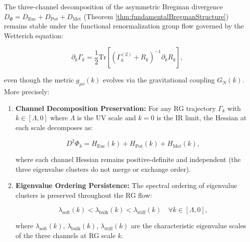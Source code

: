 
\begin{theorem}
\label{thm:divergenceRigidityRGFlow}

The three-channel decomposition of the asymmetric Bregman divergence $D_\Phi = D_{\mathrm{Euc}} + D_{\mathrm{Pot}} + D_{\mathrm{Met}}$ (Theorem \ref{thm:fundamentalBregmanStructure}) remains stable under the functional renormalization group flow governed by the Wetterich equation:

\begin{equation}
\partial_k \Gamma_k = \frac{1}{2} \mathrm{Tr}\left[(\Gamma_k^{(2)} + R_k)^{-1} \partial_k R_k\right],
\end{equation}

even though the metric $g_{\mu\nu}(k)$ evolves via the gravitational coupling $G_N(k)$. More precisely:

\begin{enumerate}

\item \textbf{Channel Decomposition Preservation:} For any RG trajectory $\Gamma_k$ with $k \in [\Lambda, 0]$ where $\Lambda$ is the UV scale and $k = 0$ is the IR limit, the Hessian at each scale decomposes as:

\begin{equation}
D^2\Phi_k = H_{\mathrm{Euc}}(k) + H_{\mathrm{Pot}}(k) + H_{\mathrm{Met}}(k),
\end{equation}

where each channel Hessian remains positive-definite and independent (the three eigenvalue clusters do not merge or exchange order).

\item \textbf{Eigenvalue Ordering Persistence:} The spectral ordering of eigenvalue clusters is preserved throughout the RG flow:

\begin{equation}
\lambda_{\mathrm{soft}}(k) < \lambda_{\mathrm{bulk}}(k) < \lambda_{\mathrm{stiff}}(k) \quad \forall k \in [\Lambda, 0],
\end{equation}

where $\lambda_{\mathrm{soft}}(k)$, $\lambda_{\mathrm{bulk}}(k)$, $\lambda_{\mathrm{stiff}}(k)$ are the characteristic eigenvalue scales of the three channels at RG scale $k$.


\end{enumerate}
\end{theorem}
